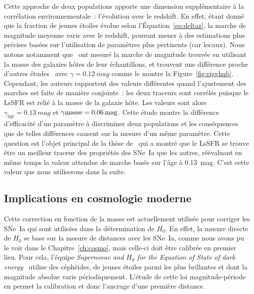 \documentclass[../main/main.tex]{subfiles}
\begin{document}
Cette approche de deux populations apporte une dimension supplémentaire à la
corrélation environnementale~: l'évolution avec le redshift. En effet, étant
donné que la fraction de jeunes étoiles évolue selon l'Équation~\ref{eq:deltaz},
la marche de magnitude moyenne varie avec le redshift, pouvant mener à des
estimations plus précises basées sur l'utilisation de paramètres plus pertinents
(car locaux). Nous notons notamment que~\cite{rigault2020} ont mesuré la marche
de magnitude trouvée en utilisant la masse des galaxies hôtes de leur
échantillons, et trouvent une différence proche d'autres
études~\citep{kelly2010, sullivan2010, gupta2011, childress2013} avec $\gamma =
\SI{0.12}{mag}$ comme le montre la Figure~\ref{fig:rigghub}. Cependant, les
auteurs rapportent des valeurs différentes quand l'ajustement des marches est
faite de manière conjointe~: les deux traceurs sont corrélés puisque le LsSFR
est relié à la masse de la galaxie hôte. Les valeurs sont alors
$\gamma_\text{âge} = \SI{0.13}{mag}$ et $\gamma{\rm masse} = \SI{0.06}{mag}$.
Cette étude montre la différence d'efficacité d'un paramètre à discriminer deux
populations et les conséquences que de telles différences causent sur la mesure
d'un même paramètre. Cette question est l'objet principal de la thèse
de~\cite{briday2021} qui a montré que le LsSFR se trouve être un meilleur
traceur des propriétés des SNe~Ia que les autres, réévaluant en même temps la
valeur attendue de marche basée sur l'âge à \SI{0.13}{mag}. C'est cette valeur
que nous utiliserons dans la suite.

\subsection{Implications en cosmologie moderne}\label{ssec:mcosmo}

Cette correction en fonction de la masse est actuellement utilisée pour corriger
les SNe~Ia qui sont utilisées dans la détermination de $H_0$. En effet, la
mesure directe de $H_0$ se base sur la mesure de distances avec les SNe~Ia,
comme nous avons pu le voir dans le Chapitre~\ref{ch:cosmo}, mais celle-ci doit
être calibrée en premier lieu. Pour cela, l'équipe \textit{Supernovae and
$H_0$ for the Equation of State of dark energy}~\citep[SH0ES,
Supernovae et $H_0$ pour l'équation d'état de l'énergie sombre][]{riess2021}
utilise des céphéides, de jeunes étoiles parmi les plus brillantes et dont la
magnitude absolue varie périodiquement. L'étude de cette loi magnitude-période
en permet la calibration et donc l'ancrage d'une première distance.
\end{document}
